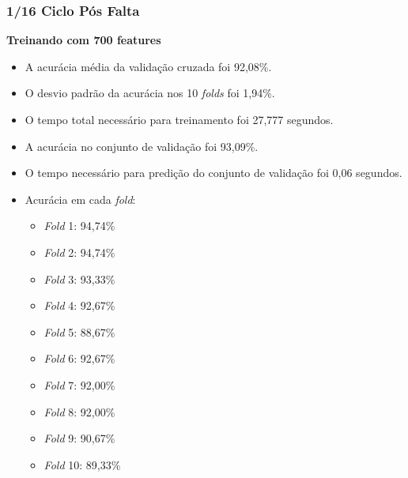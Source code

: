\subsubsection{1/16 Ciclo Pós Falta}
\textbf{Treinando com 700 features}
\begin{itemize}
    \item A acurácia média da validação cruzada foi 92,08\%.
    \item O desvio padrão da acurácia nos 10 \textit{folds} foi 1,94\%.
    \item O tempo total necessário para treinamento foi 27,777 segundos.
    \item A acurácia no conjunto de validação foi 93,09\%.
    \item O tempo necessário para predição do conjunto de validação foi 0,06 segundos.
    \item Acurácia em cada \textit{fold}:
    \begin{itemize}
        \item \textit{Fold} 1: 94,74\%
        \item \textit{Fold} 2: 94,74\%
        \item \textit{Fold} 3: 93,33\%
        \item \textit{Fold} 4: 92,67\%
        \item \textit{Fold} 5: 88,67\%
        \item \textit{Fold} 6: 92,67\%
        \item \textit{Fold} 7: 92,00\%
        \item \textit{Fold} 8: 92,00\%
        \item \textit{Fold} 9: 90,67\%
        \item \textit{Fold} 10: 89,33\%
    \end{itemize}
\end{itemize}

